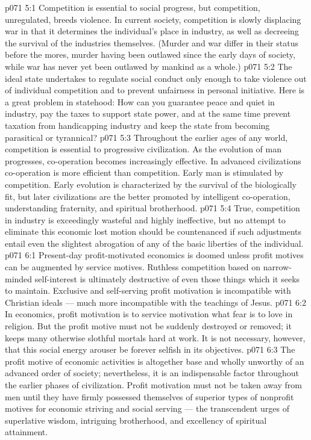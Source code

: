 \vs p071 5:1 Competition is essential to social progress, but competition, unregulated, breeds violence. In current society, competition is slowly displacing war in that it determines the individual’s place in industry, as well as decreeing the survival of the industries themselves. (Murder and war differ in their status before the mores, murder having been outlawed since the early days of society, while war has never yet been outlawed by mankind as a whole.)
\vs p071 5:2 The ideal state undertakes to regulate social conduct only enough to take violence out of individual competition and to prevent unfairness in personal initiative. Here is a great problem in statehood: How can you guarantee peace and quiet in industry, pay the taxes to support state power, and at the same time prevent taxation from handicapping industry and keep the state from becoming parasitical or tyrannical?
\vs p071 5:3 Throughout the earlier ages of any world, competition is essential to progressive civilization. As the evolution of man progresses, co\hyp{}operation becomes increasingly effective. In advanced civilizations co\hyp{}operation is more efficient than competition. Early man is stimulated by competition. Early evolution is characterized by the survival of the biologically fit, but later civilizations are the better promoted by intelligent co\hyp{}operation, understanding fraternity, and spiritual brotherhood.
\vs p071 5:4 True, competition in industry is exceedingly wasteful and highly ineffective, but no attempt to eliminate this economic lost motion should be countenanced if such adjustments entail even the slightest abrogation of any of the basic liberties of the individual.
\vs p071 6:1 Present\hyp{}day profit\hyp{}motivated economics is doomed unless profit motives can be augmented by service motives. Ruthless competition based on narrow\hyp{}minded self\hyp{}interest is ultimately destructive of even those things which it seeks to maintain. Exclusive and self\hyp{}serving profit motivation is incompatible with Christian ideals --- much more incompatible with the teachings of Jesus.
\vs p071 6:2 In economics, profit motivation is to service motivation what fear is to love in religion. But the profit motive must not be suddenly destroyed or removed; it keeps many otherwise slothful mortals hard at work. It is not necessary, however, that this social energy arouser be forever selfish in its objectives.
\vs p071 6:3 The profit motive of economic activities is altogether base and wholly unworthy of an advanced order of society; nevertheless, it is an indispensable factor throughout the earlier phases of civilization. Profit motivation must not be taken away from men until they have firmly possessed themselves of superior types of nonprofit motives for economic striving and social serving --- the transcendent urges of superlative wisdom, intriguing brotherhood, and excellency of spiritual attainment.
